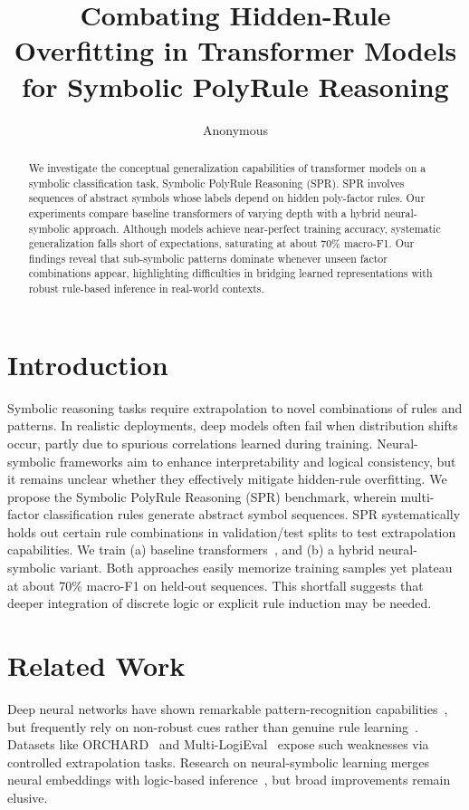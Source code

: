 \documentclass{article} %
\title{Combating Hidden-Rule Overfitting in Transformer Models\\ for Symbolic PolyRule Reasoning}
\author{Anonymous}
\begin{document}
\maketitle
\begin{abstract}
We investigate the conceptual generalization capabilities of transformer models on a symbolic classification task, Symbolic PolyRule Reasoning (SPR). SPR involves sequences of abstract symbols whose labels depend on hidden poly-factor rules. Our experiments compare baseline transformers of varying depth with a hybrid neural-symbolic approach. Although models achieve near-perfect training accuracy, systematic generalization falls short of expectations, saturating at about 70\% macro-F1. Our findings reveal that sub-symbolic patterns dominate whenever unseen factor combinations appear, highlighting difficulties in bridging learned representations with robust rule-based inference in real-world contexts.
\end{abstract}

\section{Introduction}
Symbolic reasoning tasks require extrapolation to novel combinations of rules and patterns. In realistic deployments, deep models often fail when distribution shifts occur, partly due to spurious correlations learned during training. Neural-symbolic frameworks aim to enhance interpretability and logical consistency, but it remains unclear whether they effectively mitigate hidden-rule overfitting. We propose the Symbolic PolyRule Reasoning (SPR) benchmark, wherein multi-factor classification rules generate abstract symbol sequences. SPR systematically holds out certain rule combinations in validation/test splits to test extrapolation capabilities. We train (a) baseline transformers~\citep{vaswani2017attentionia}, and (b) a hybrid neural-symbolic variant. Both approaches easily memorize training samples yet plateau at about 70\% macro-F1 on held-out sequences. This shortfall suggests that deeper integration of discrete logic or explicit rule induction may be needed.

\section{Related Work}
Deep neural networks have shown remarkable pattern-recognition capabilities~\citep{goodfellow2016deep}, but frequently rely on non-robust cues rather than genuine rule learning~\citep{bergen2021systematicgw}. Datasets like ORCHARD~\citep{pung2021orchardab} and Multi-LogiEval~\citep{patel2024multilogievalte} expose such weaknesses via controlled extrapolation tasks. Research on neural-symbolic learning merges neural embeddings with logic-based inference~\citep{garcez2015neuralsymbolicla}, but broad improvements remain elusive.
\end{document}
